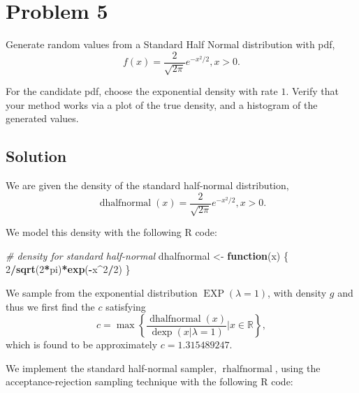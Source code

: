\documentclass[
]{article}
\newenvironment{Shaded}{\begin{snugshade}}{\end{snugshade}}
\newcommand{\CommentTok}[1]{\textcolor[rgb]{0.56,0.35,0.01}{\textit{#1}}}
\newcommand{\ControlFlowTok}[1]{\textcolor[rgb]{0.13,0.29,0.53}{\textbf{#1}}}
\newcommand{\DecValTok}[1]{\textcolor[rgb]{0.00,0.00,0.81}{#1}}
\newcommand{\FunctionTok}[1]{\textcolor[rgb]{0.13,0.29,0.53}{\textbf{#1}}}
\newcommand{\NormalTok}[1]{#1}
\newcommand{\OtherTok}[1]{\textcolor[rgb]{0.56,0.35,0.01}{#1}}
\newcommand{\SpecialCharTok}[1]{\textcolor[rgb]{0.81,0.36,0.00}{\textbf{#1}}}
\begin{document}
\hypertarget{problem-5}{%
\section{Problem 5}\label{problem-5}}

Generate random values from a Standard Half Normal distribution with
pdf, \[
f(x) = \frac{2}{\sqrt{2 \pi}} e^{-x^2/2} , x > 0.
\]

For the candidate pdf, choose the exponential density with rate \(1\).
Verify that your method works via a plot of the true density, and a
histogram of the generated values.

\hypertarget{solution-2}{%
\subsection{Solution}\label{solution-2}}

We are given the density of the standard half-normal distribution, \[
  \operatorname{dhalfnormal}(x) = \frac{2}{\sqrt{2 \pi}} e^{-x^2/2}, x > 0.
\]

We model this density with the following R code:

\begin{Shaded}
\begin{Highlighting}[]
\CommentTok{\# density for standard half{-}normal}
\NormalTok{dhalfnormal }\OtherTok{\textless{}{-}} \ControlFlowTok{function}\NormalTok{(x) \{ }\DecValTok{2}\SpecialCharTok{/}\FunctionTok{sqrt}\NormalTok{(}\DecValTok{2}\SpecialCharTok{*}\NormalTok{pi)}\SpecialCharTok{*}\FunctionTok{exp}\NormalTok{(}\SpecialCharTok{{-}}\NormalTok{x}\SpecialCharTok{\^{}}\DecValTok{2}\SpecialCharTok{/}\DecValTok{2}\NormalTok{) \}}
\end{Highlighting}
\end{Shaded}

We sample from the exponential distribution
\(\operatorname{EXP}(\lambda=1)\), with density \(g\) and thus we first
find the \(c\) satisfying \[
  c = \max \left\{ \frac{\operatorname{dhalfnormal}(x)}{\operatorname{dexp}(x|\lambda=1)} | x \in \mathbb{R} \right\},
\] which is found to be approximately \(c = 1.315489247\).

We implement the standard half-normal sampler,
\(\operatorname{rhalfnormal}\), using the acceptance-rejection sampling
technique with the following R code:
\end{document}
